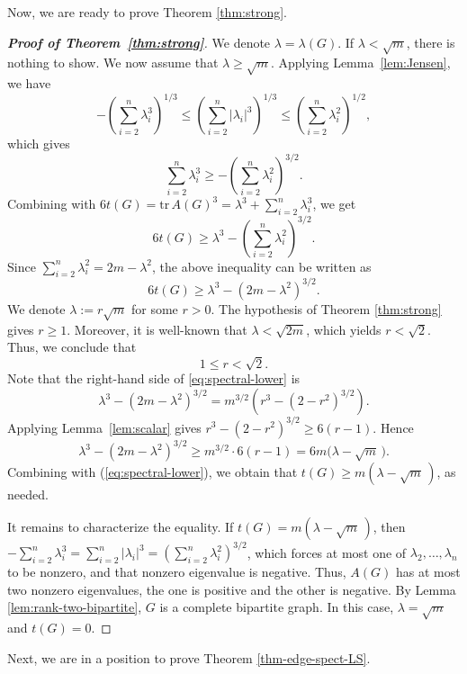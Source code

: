 \documentclass[11pt,a4paper]{article}
\theoremstyle{definition}
\theoremstyle{plain}
\renewcommand{\le}{\leqslant}
\renewcommand{\geq}{\geqslant}
\renewcommand{\ge}{\geqslant}
\begin{document}
Now, we are ready to prove Theorem \ref{thm:strong}. 

\begin{proof}[{\bf Proof of Theorem~\ref{thm:strong}}] 
We denote $ \lambda=\lambda(G)$.  
If $\lambda < \sqrt m$, there is nothing to show. We now assume that $\lambda \geq \sqrt m$. 
Applying Lemma~\ref{lem:Jensen}, we have 
\[ -\left( \sum_{i=2}^n\lambda_i^3 \right)^{1/3} \le \left( \sum_{i=2}^n |\lambda_i|^3 \right)^{1/3} \le \left( \sum_{i=2}^n\lambda_i^2 \right)^{1/2}, \]
which gives 
\[
    \sum_{i=2}^n\lambda_i^3
    \geq
    -\left(\sum_{i=2}^n\lambda_i^2\right)^{3/2}.
\]
Combining with $ 6t(G)= \mathrm{tr}\,A(G)^3 = \lambda^3+\sum_{i=2}^n\lambda_i^3$, 
we get 
\[
    6t(G)
    \geq
    \lambda^3-
    \left(\sum_{i=2}^n\lambda_i^2\right)^{3/2}.
\]
Since $  \sum_{i=2}^n\lambda_i^2=2m-\lambda^2$, the above inequality can be written as  
\begin{equation}\label{eq:spectral-lower}
    6t(G)
    \geq
    \lambda^3-(2m-\lambda^2)^{3/2}.
\end{equation}
We denote $ \lambda:= r{\sqrt m}$ for some $r >0$.  
The hypothesis of Theorem \ref{thm:strong} gives $r\ge 1$. Moreover, it is well-known that $\lambda <\sqrt{2m}$, which yields $r< \sqrt{2}$. Thus, 
we conclude that $$ 1\le r< \sqrt{2}. $$ 
Note that the right-hand side of \eqref{eq:spectral-lower} 
is 
\[
    \lambda^3-(2m-\lambda^2)^{3/2}
    =m^{3/2}\left(r^3-(2-r^2)^{3/2}\right).
\]
Applying Lemma~\ref{lem:scalar} gives 
$ r^3-(2-r^2)^{3/2}\geq 6(r-1)$.  
Hence
\begin{equation*} 
      \lambda^3-(2m-\lambda^2)^{3/2}
    \geq
    m^{3/2} \cdot 6(r-1) = 6m \big(\lambda - \sqrt{m}\, \big).
\end{equation*}
Combining with (\ref{eq:spectral-lower}), we obtain that 
$ t(G)\geq m(\lambda-\sqrt m\,)$, as needed. 

It remains to characterize the equality. If $t(G)=m(\lambda-\sqrt m\,)$, then
 $-\sum_{i=2}^n\lambda_i^3 = \sum_{i=2}^n |\lambda_i|^3=(\sum_{i=2}^n\lambda_i^2)^{3/2}$, which forces at most one of $\lambda_2,\dots,\lambda_n$ to be nonzero, and that nonzero eigenvalue is negative. 
Thus, $A(G)$ has at most two nonzero eigenvalues, the one is positive and the other is negative. By Lemma \ref{lem:rank-two-bipartite}, $G$ is a complete bipartite
graph. In this case, $\lambda=\sqrt m$ and $t(G)=0$. 
\end{proof}

Next, we are in a position to prove Theorem \ref{thm-edge-spect-LS}. 
\end{document}
